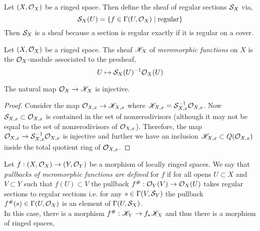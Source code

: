 \documentclass[12pt]{article}
\begin{document}
\begin{definition}
Let $(X, \struct{X})$ be a ringed space. Then define the sheaf of regular sections $\S_X$ via, 
\[ \S_X(U) = \{ f \in \Gamma(U, \struct{X}) \mid \text{regular} \} \]
Then $\S_X$ is a sheaf because a section is regular exactly if it is regular on a cover.
\end{definition}

\begin{definition}
Let $(X, \struct{X})$ be a ringed space. The sheaf $\K_X$ of \textit{meromorphic functions} on $X$ is the $\struct{X}$-module associated to the presheaf,
\[ U \mapsto \S_X(U)^{-1} \struct{X}(U) \]
\end{definition}

\begin{lemma}
The natural map $\struct{X} \to \K_X$ is injective. 
\end{lemma}

\begin{proof}
Consider the map $\stalk{X}{x} \to \K_{X,x}$ where $\K_{X,x} = \S_{X,x}^{-1} \stalk{X}{x}$.  Now $\S_{X,x} \subset \stalk{X}{x}$ is contained in the set of nonzerodivisors (although it may not be equal to the set of nonzerodivisors of $\stalk{X}{x}$). Therefore, the map $\stalk{X}{x} \to \S_{X,x}^{-1} \stalk{X}{x}$ is injective and further we have an inclusion $\K_{X,x} \subset Q(\stalk{X}{x})$ inside the total quotient ring of $\stalk{X}{x}$. 
\end{proof}

\begin{defn}
Let $f : (X, \struct{X}) \to (Y, \struct{Y})$ be a morphism of locally ringed spaces. We say that \textit{pullbacks of meromorphic functions are defined} for $f$ if for all opens $U \subset X$ and $V \subset Y$ such that $f(U) \subset V$ the pullback $f^\# : \struct{Y}(V) \to \struct{X}(U)$ takes regular sections to regular sections i.e. for any $s \in \Gamma(V, \S_Y)$ the pullback $f^\#(s) \in \Gamma(U, \struct{X})$ is an element of $\Gamma(U, \S_X)$.
\bigskip\\
In this case, there is a morphism $f^\# : \K_Y \to f_* \K_X$ and thus there is a morphism of ringed spaces,
\begin{center}
\end{center}
\end{defn}
\end{document}
